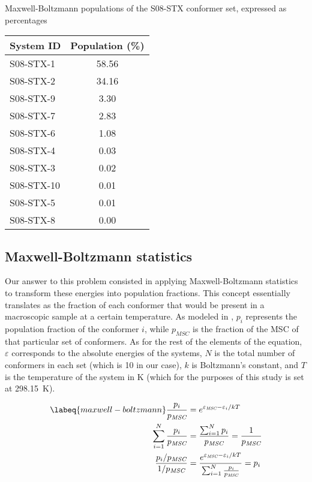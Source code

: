 \begin{margintable}
    \centering
    \caption[Maxwell-Boltzmann populations of S08-STX]{Maxwell-Boltzmann populations of the S08-STX conformer set, expressed as percentages}
    \begin{tabular}{@{}l
                       S[table-format=2.2]@{}}
        \toprule
        System ID & {Population (\si{\percent})} \\
        \midrule
        S08-STX-1 & 58.56 \\
        S08-STX-2 & 34.16 \\
        S08-STX-9 & 3.30 \\
        S08-STX-7 & 2.83 \\
        S08-STX-6 & 1.08 \\
        S08-STX-4 & 0.03 \\
        S08-STX-3 & 0.02 \\
        S08-STX-10 & 0.01 \\
        S08-STX-5 & 0.01 \\
        S08-STX-8 & 0.00 \\
    \end{tabular}
\end{margintable}

\subsection{Maxwell-Boltzmann statistics}
Our answer to this problem consisted in applying Maxwell-Boltzmann statistics to transform these energies into population fractions.
This concept essentially translates as the fraction of each conformer that would be present in a macroscopic sample at a certain temperature.
As modeled in , $p_i$ represents the population fraction of the conformer $i$, while $p_\textit{MSC}$ is the fraction of the MSC of that particular set of conformers.
As for the rest of the elements of the equation, $\varepsilon$ corresponds to the absolute energies of the systems, $N$ is the total number of conformers in each set (which is 10 in our case), $k$ is Boltzmann's constant, and $T$ is the temperature of the system in \si{\kelvin} (which for the purposes of this study is set at \SI{298.15}{\kelvin}).

\begin{align}
\begin{split}
    \labeq{maxwell-boltzmann}
    \frac{p_i}{p_\textit{MSC}}&=e^{\varepsilon_\textit{MSC}-\varepsilon_i/kT} \\
    \sum_{i=1}^{N}\frac{p_i}{p_\textit{MSC}}&=\frac{\sum_{i=1}^{N}p_i}{p_\textit{MSC}}=\frac{1}{p_\textit{MSC}} \\
    \frac{p_i/p_\textit{MSC}}{1/p_\textit{MSC}}&=\frac{e^{\varepsilon_\textit{MSC}-\varepsilon_i/kT}}{\sum_{i=1}^{N}\frac{p_i}{p_\textit{MSC}}}=p_i \\
\end{split}
\end{align}

